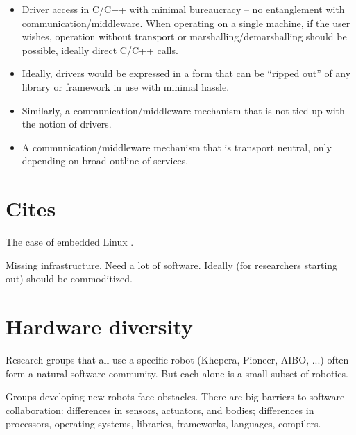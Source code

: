 \begin{itemize}

\item Driver access in C/C++ with minimal bureaucracy -- no
entanglement with communication/middleware.  When operating
on a single machine, if the user wishes, operation without
transport or marshalling/demarshalling should be possible, ideally
direct C/C++ calls.

\item Ideally, drivers would be expressed in a form that
can be ``ripped out'' of any library or framework in use
with minimal hassle.

\item Similarly, a communication/middleware mechanism that is 
not tied up with the notion of drivers.

\item A communication/middleware mechanism that is transport
neutral, only depending on broad outline of services.



\end{itemize}


\section{Cites}

\cite{kramer2007development}

\cite{gerkey03player}

\cite{natale05developmental}

\cite{nesnas2006claraty}

\cite{vaughan2006really}

\cite{vonkrogh2006promise}


The case of embedded Linux \cite{henkel2006selective}.

Missing infrastructure.
Need a lot of software.
Ideally (for researchers starting out) should be commoditized.

\section{Hardware diversity}

Research groups that all use a specific robot (Khepera, Pioneer, AIBO,
...) often form a natural software community.  But each alone is 
a small subset of robotics.

Groups developing new robots face obstacles.  There are big barriers
to software collaboration: differences in sensors, actuators, and
bodies; differences in processors, operating systems, libraries,
frameworks, languages, compilers.


